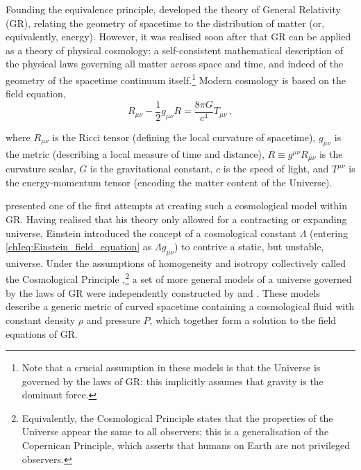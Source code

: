 Founding the equivalence principle, \citet{1915SPAW.......844E} developed the theory of General Relativity (GR), relating the geometry of spacetime to the distribution of matter (or, equivalently, energy). However, it was realised soon after that GR can be applied as a theory of physical cosmology: a self-consistent mathematical description of the physical laws governing all matter across space and time, and indeed of the geometry of the spacetime continuum itself.\footnote{Note that a crucial assumption in these models is that the Universe is governed by the laws of GR: this implicitly assumes that gravity is the dominant force.} Modern cosmology is based on the \citeauthor{1915SPAW.......844E} field equation,
\begin{equation}
    \label{chIeq:Einstein_field_equation}
    R_{\mu \nu} - \frac{1}{2} g_{\mu \nu} R = \frac{8 \pi G}{c^4} T_{\mu \nu} \, ,
\end{equation}

\noindent where $R_{\mu \nu}$ is the Ricci tensor (defining the local curvature of spacetime), $g_{\mu \nu}$ is the metric (describing a local measure of time and distance), $R \equiv g^{\mu \nu} R_{\mu \nu}$ is the curvature scalar, $G$ is the gravitational constant, $c$ is the speed of light, and $T^{\mu \nu}$ is the energy-momentum tensor (encoding the matter content of the Universe).

\citet{1917SPAW.......142E} presented one of the first attempts at creating such a cosmological model within GR. Having realised that his theory only allowed for a contracting or expanding universe, Einstein introduced the concept of a cosmological constant $\Lambda$ (entering \cref{chIeq:Einstein_field_equation} as $\Lambda g_{\mu \nu}$) to contrive a static, but unstable, universe. Under the assumptions of homogeneity and isotropy collectively called the Cosmological Principle \citep{1933ZA......6....1M},\footnote{Equivalently, the Cosmological Principle states that the properties of the Universe appear the same to all observers; this is a generalisation of the Copernican Principle, which asserts that humans on Earth are not privileged observers.} a set of more general models of a universe governed by the laws of GR were independently constructed by \citet{1922ZPhy...10..377F} and \citet{1927PhDT.........6L}. These models describe a generic metric of curved spacetime containing a cosmological fluid with constant density $\rho$ and pressure $P$, which together form a solution to the field equations of GR.

